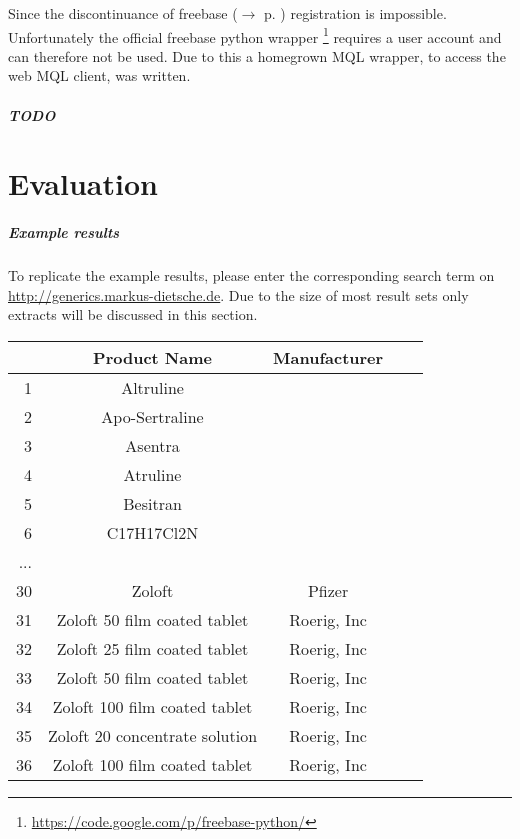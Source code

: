 \documentclass[11pt,titlepage,oneside,openany]{book}
\begin{document}
Since the discontinuance of freebase ($\rightarrow$ p. \pageref{prob:freebase}) registration is impossible. Unfortunately the official freebase python wrapper \footnote{\url{https://code.google.com/p/freebase-python/}} requires a user account and can therefore not be used. Due to this a homegrown MQL wrapper, to access the web MQL client, was written.



  \paragraph{TODO}
\label{TODO}


\chapter{Evaluation}
\label{cha:evaluation}

\paragraph{Example results}

To replicate the example results, please enter the corresponding search term on \url{http://generics.markus-dietsche.de}. Due to the size of most result sets only extracts will be discussed in this section.

\begin{center}
\begin{tabular}{rccll}
\hline 
 & \textbf{Product Name} &\textbf{ Manufacturer}  \\ 
\hline 
1 & Altruline &  \\ 
\hline 
2 & Apo-Sertraline & \\ 
\hline 
3 & Asentra &  \\ 
\hline 
4 & Atruline	 &  \\ 
\hline 
5 & Besitran	 &  \\ 
\hline 
6 & C17H17Cl2N &  \\ 
\hline 
...  &  &  \\ 
\hline 
30 & Zoloft &	Pfizer \\ 
\hline 
31 & Zoloft 50 film coated tablet & Roerig, Inc \\ 
\hline 
32 & Zoloft 25 film coated tablet & Roerig, Inc \\ 
\hline 
33 & Zoloft 50 film coated tablet & Roerig, Inc \\ 
\hline 
34 & Zoloft 100 film coated tablet & Roerig, Inc \\ 
\hline 
35 & Zoloft 20 concentrate solution & Roerig, Inc \\ 
\hline 
36 & Zoloft 100 film coated tablet & Roerig, Inc \\ 
\hline 
\end{tabular}
\label{example:lustral}
\end{center}
\end{document}
